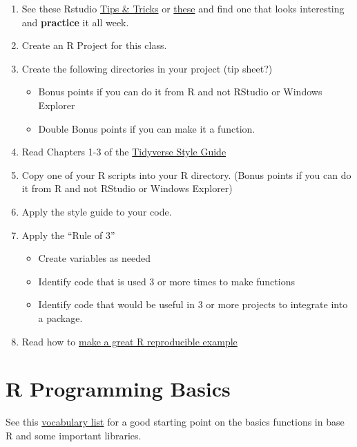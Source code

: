 \documentclass[]{book}
\providecommand{\tightlist}{%
  \setlength{\itemsep}{0pt}\setlength{\parskip}{0pt}}
\theoremstyle{definition}
\theoremstyle{definition}
\theoremstyle{definition}
\theoremstyle{remark}
\begin{document}
\begin{enumerate}
\def\labelenumi{\arabic{enumi}.}
\tightlist
\item
  See these Rstudio
  \href{https://rviews.rstudio.com/categories/tips-and-tricks/}{Tips \&
  Tricks} or \href{https://twitter.com/rstudiotips}{these} and find one
  that looks interesting and \textbf{practice} it all week.
\item
  Create an R Project for this class.
\item
  Create the following directories in your project (tip sheet?)

  \begin{itemize}
  \tightlist
  \item
    Bonus points if you can do it from R and not RStudio or Windows
    Explorer
  \item
    Double Bonus points if you can make it a function.
  \end{itemize}
\item
  Read Chapters 1-3 of the
  \href{http://style.tidyverse.org/index.html}{Tidyverse Style Guide}
\item
  Copy one of your R scripts into your R directory. (Bonus points if you
  can do it from R and not RStudio or Windows Explorer)
\item
  Apply the style guide to your code.\\
\item
  Apply the ``Rule of 3''

  \begin{itemize}
  \tightlist
  \item
    Create variables as needed
  \item
    Identify code that is used 3 or more times to make functions
  \item
    Identify code that would be useful in 3 or more projects to
    integrate into a package.
  \end{itemize}
\item
  Read how to
  \href{https://stackoverflow.com/questions/5963269/how-to-make-a-great-r-reproducible-example}{make
  a great R reproducible example}
\end{enumerate}

\chapter{R Programming Basics}\label{r-programming-basics}

See this \href{http://adv-r.had.co.nz/Vocabulary.html}{vocabulary list}
for a good starting point on the basics functions in base R and some
important libraries.
\end{document}
